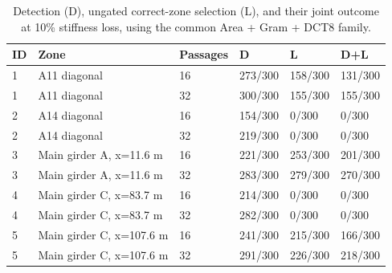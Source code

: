 \begin{table}[htbp]
\centering
\small
\setlength{\tabcolsep}{4pt}
\caption{Detection (D), ungated correct-zone selection (L), and their joint outcome at 10\% stiffness loss, using the common Area + Gram + DCT8 family.}
\label{tab:kw51-common-feature-low-severity-metrics}
\begin{tabular}{@{}llllll@{}}
\toprule
ID & Zone & Passages & D & L & D+L \\
\midrule
1 & A11 diagonal & 16 & 273/300 & 158/300 & 131/300 \\
1 & A11 diagonal & 32 & 300/300 & 155/300 & 155/300 \\
2 & A14 diagonal & 16 & 154/300 & 0/300 & 0/300 \\
2 & A14 diagonal & 32 & 219/300 & 0/300 & 0/300 \\
3 & Main girder A, x=11.6 m & 16 & 221/300 & 253/300 & 201/300 \\
3 & Main girder A, x=11.6 m & 32 & 283/300 & 279/300 & 270/300 \\
4 & Main girder C, x=83.7 m & 16 & 214/300 & 0/300 & 0/300 \\
4 & Main girder C, x=83.7 m & 32 & 282/300 & 0/300 & 0/300 \\
5 & Main girder C, x=107.6 m & 16 & 241/300 & 215/300 & 166/300 \\
5 & Main girder C, x=107.6 m & 32 & 291/300 & 226/300 & 218/300 \\
\bottomrule
\end{tabular}
\end{table}

